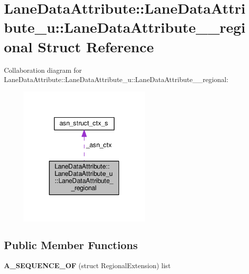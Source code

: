 \hypertarget{structLaneDataAttribute_1_1LaneDataAttribute__u_1_1LaneDataAttribute____regional}{}\section{Lane\+Data\+Attribute\+:\+:Lane\+Data\+Attribute\+\_\+u\+:\+:Lane\+Data\+Attribute\+\_\+\+\_\+regional Struct Reference}
\label{structLaneDataAttribute_1_1LaneDataAttribute__u_1_1LaneDataAttribute____regional}


Collaboration diagram for Lane\+Data\+Attribute\+:\+:Lane\+Data\+Attribute\+\_\+u\+:\+:Lane\+Data\+Attribute\+\_\+\+\_\+regional\+:\nopagebreak
\begin{figure}[H]
\begin{center}
\leavevmode
\includegraphics[width=187pt]{structLaneDataAttribute_1_1LaneDataAttribute__u_1_1LaneDataAttribute____regional__coll__graph}
\end{center}
\end{figure}
\subsection*{Public Member Functions}
\begin{DoxyCompactItemize}
\item 
{\bfseries A\+\_\+\+S\+E\+Q\+U\+E\+N\+C\+E\+\_\+\+OF} (struct Regional\+Extension) list\hypertarget{structLaneDataAttribute_1_1LaneDataAttribute__u_1_1LaneDataAttribute____regional_a944f36d1c2d2963e22aaf3d939e2390a}{}\label{structLaneDataAttribute_1_1LaneDataAttribute__u_1_1LaneDataAttribute____regional_a944f36d1c2d2963e22aaf3d939e2390a}

\end{DoxyCompactItemize}
